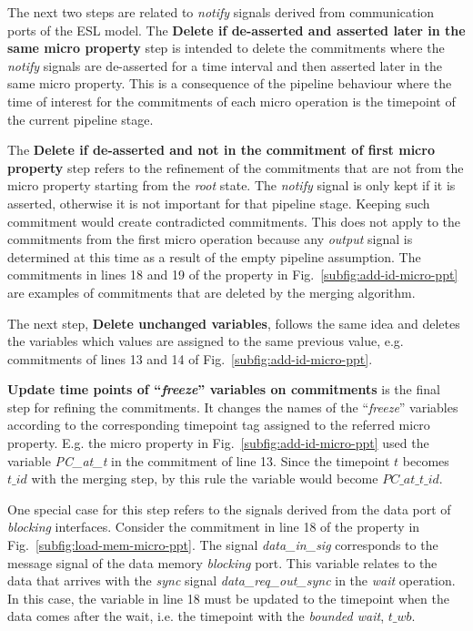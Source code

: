 The next two steps are related to \textit{notify} signals derived from communication ports of the ESL model. The \textbf{Delete if de-asserted and asserted later in the same micro property} step is intended to delete the commitments where the \textit{notify} signals are de-asserted for a time interval and then asserted later in the same micro property. This is a consequence of the pipeline behaviour where the time of interest for the commitments of each micro operation is the timepoint of the current pipeline stage.

The \textbf{Delete if de-asserted and not in the commitment of first micro property} step refers to the refinement of the commitments that are not from the micro property starting from the \textit{root} state. The \textit{notify} signal is only kept if it is asserted, otherwise it is not important for that pipeline stage. Keeping such commitment would create contradicted commitments. This does not apply to the commitments from the first micro operation because any \textit{output} signal is determined at this time as a result of the empty pipeline assumption. The commitments in lines 18 and 19 of the property in Fig.~\ref{subfig:add-id-micro-ppt} are examples of commitments that are deleted by the merging algorithm.

The next step, \textbf{Delete unchanged variables}, follows the same idea and deletes the variables which values are assigned to the same previous value, e.g. commitments of lines 13 and 14 of Fig.~\ref{subfig:add-id-micro-ppt}.

\textbf{Update time points of “\textit{freeze}” variables on commitments} is the final step for refining the commitments. It changes the names of the “\textit{freeze}” variables according to the corresponding timepoint tag assigned to the referred micro property. E.g. the micro property in Fig.~\ref{subfig:add-id-micro-ppt} used the variable \textit{PC\_at\_t} in the commitment of line 13. Since the timepoint $t$ becomes $t\_id$ with the merging step, by this rule the variable would become $PC\_at\_t\_id$. 

One special case for this step refers to the signals derived from the data port of \textit{blocking} interfaces. Consider the commitment in line 18 of the property in Fig.~\ref{subfig:load-mem-micro-ppt}. The signal \textit{data\_in\_sig} corresponds to the message signal of the data memory \textit{blocking} port. This variable relates to the data that arrives with the \textit{sync} signal \textit{data\_req\_out\_sync} in the \textit{wait} operation. In this case, the variable in line 18 must be updated to the timepoint when the data comes after the wait, i.e. the timepoint with the \textit{bounded wait}, $t\_wb$.

